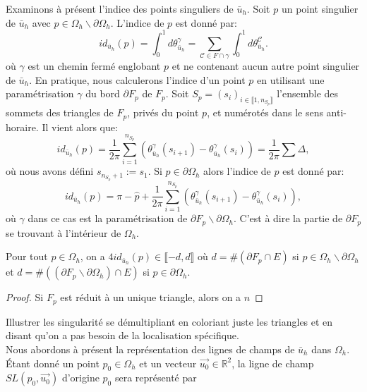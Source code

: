 Examinons à présent l'indice des points singuliers de $\bar{u}_h$. Soit $p$ un point singulier de $\bar{u}_h$ avec $p\in\Omega_h\backslash\partial\Omega_h$. L'indice de $p$ est donné par:
$$
id_{\bar{u}_h}(p)=\int_0^1 d\theta^\gamma_{\bar{u}_h}=\sum_{\mathcal{C}\in F\cap\gamma}\int_0^1 d\theta^{\mathcal{C}}_{\bar{u}_h}.
$$
où $\gamma$ est un chemin fermé englobant $p$ et ne contenant aucun autre point singulier de $\bar{u}_h$. En pratique, nous calculerons l'indice d'un point $p$ en utilisant une paramétrisation $\gamma$ du bord $\partial F_p$ de $F_p$. Soit $S_p=(s_i)_{i\in\llbracket 1, n_{S_p}\rrbracket}$ l'ensemble des sommets des triangles de $F_p$, privés du point $p$, et numérotés dans le sens anti-horaire.  Il vient alors que:
\begin{equation}
    id_{\bar{u}_h}(p)=\displaystyle\frac{1}{2\pi}\displaystyle\sum_{i=1}^{n_{S_p}}\left(\theta^\gamma_{\bar{u}_h}(s_{i+1})-\theta^\gamma_{\bar{u}_h}(s_i)\right)=\displaystyle\frac{1}{2\pi}\sum\Delta,
\end{equation}
où  nous avons défini $s_{n_{S_p}+1}:=s_1$.
Si $p\in\partial\Omega_h$ alors l'indice de $p$ est donné par:
\begin{equation}
    id_{\bar{u}_h}(p)=\pi-\widehat{p}+\displaystyle\frac{1}{2\pi}\displaystyle\sum_{i=1}^{n_{S_p}}\left(\theta^\gamma_{\bar{u}_h}(s_{i+1})-\theta^\gamma_{\bar{u}_h}(s_i)\right),
\end{equation}
où $\gamma$ dans ce cas est la paramétrisation de $\partial F_p\backslash\partial\Omega_h$. C'est à dire la partie de $\partial F_p$ se trouvant à l'intérieur de $\Omega_h$.

\begin{proposition}
    Pour tout $p\in\Omega_h$, on a $4id_{\bar{u}_h}(p)\in\llbracket -d, d\rrbracket$ où $d=\#(\partial F_p\cap E)$ si $p\in\Omega_h\backslash\partial\Omega_h$ et $d=\#((\partial F_p\backslash\partial\Omega_h)\cap E)$ si $p\in\partial\Omega_h$.
\end{proposition}

\begin{proof}
    Si $F_p$ est réduit à un unique triangle, alors on a $n$
\end{proof}


Illustrer les singularité se démultipliant  en coloriant juste les triangles et en disant qu'on a pas besoin de la localisation spécifique.\\

Nous abordons à présent la représentation des lignes de champs de $\bar{u}_h$ dans $\Omega_h$. \'Etant donné un point $p_0\in\Omega_h$ et un vecteur $\overrightarrow{u_0}\in\mathbb{R}^2$, la ligne de champ $SL(p_0, \overrightarrow{u_0})$ d'origine $p_0$ sera représenté par 

